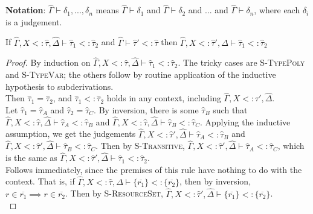 \documentclass{llncs}
\begin{document}
\noindent
\textbf{Notation}: $\hat \Gamma \vdash \delta_1, ..., \delta_n$ means $\hat \Gamma \vdash \delta_1$ and $\hat \Gamma \vdash \delta_2$ and ... and $\hat \Gamma \vdash \delta_n$, where each $\delta_i$ is a judgement.

\hrulefill

\begin{lemma}
If $\hat \Gamma, X <: \hat \tau, \hat \Delta \vdash \hat \tau_1 <: \hat \tau_2$ and $\hat \Gamma \vdash \hat \tau' <: \hat \tau$ then $\hat \Gamma, X <: \hat \tau', \hat \Delta \vdash \hat \tau_1 <: \hat \tau_2$
\end{lemma}

\begin{proof}

By induction on $\hat \Gamma, X<: \hat \tau, \hat \Delta \vdash \hat \tau_1 <: \hat \tau_2$. The tricky cases are \textsc{S-TypePoly} and \textsc{S-TypeVar}; the others follow by routine application of the inductive hypothesis to subderivations.\\

 Then $\hat \tau_1 = \hat \tau_2$, and $\hat \tau_1 <: \hat \tau_2$ holds in any context, including $\hat \Gamma, X <: \hat \tau', \hat \Delta$.\\

 Let $\hat \tau_1 = \hat \tau_A$ and $\hat \tau_2 = \hat \tau_C$. By inversion, there is some $\hat \tau_B$ such that $\hat \Gamma, X <: \hat \tau, \hat \Delta \vdash \hat \tau_A <: \hat \tau_B$ and $\hat \Gamma, X <: \hat \tau, \hat \Delta \vdash \hat \tau_B <: \hat \tau_C$. Applying the inductive assumption, we get the judgements $\hat \Gamma, X <: \hat \tau', \hat \Delta \vdash \hat \tau_A <: \hat \tau_B$ and $\hat \Gamma, X <: \hat \tau', \hat \Delta \vdash \hat \tau_B <: \hat \tau_C$. Then by \textsc{S-Transitive}, $\hat \Gamma, X <: \hat \tau', \hat \Delta \vdash \hat \tau_A <: \hat \tau_C$, which is the same as $\hat \Gamma, X <: \hat \tau', \hat \Delta \vdash \hat \tau_1 <: \hat \tau_2$.\\

 Follows immediately, since the premises of this rule have nothing to do with the context. That is, if $\hat \Gamma, X <: \hat \tau, \hat \Delta \vdash \{ \overline{r_1} \} <: \{ \overline{r_2} \}$, then by inversion, $r \in \overline{r_1} \implies r \in \overline{r_2}$. Then by \textsc{S-ResourceSet}, $\hat \Gamma, X <: \hat \tau', \hat \Delta \vdash \{ \overline{r_1} \} <: \{ \overline{r_2} \}$.\\


\end{proof}
\end{document}

